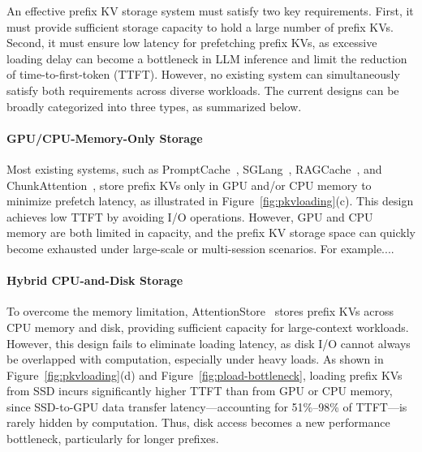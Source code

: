 

An effective prefix KV storage system must satisfy two key requirements. First, it must provide sufficient storage capacity to hold a large number of prefix KVs. Second, it must ensure low latency for prefetching prefix KVs, as excessive loading delay can become a bottleneck in LLM inference and limit the reduction of time-to-first-token (TTFT). However, no existing system can simultaneously satisfy both requirements across diverse workloads. The current designs can be broadly categorized into three types, as summarized below.

\paragraph{GPU/CPU-Memory-Only Storage}  
Most existing systems, such as PromptCache~\cite{promptcache-mlsys24}, SGLang~\cite{sglang-arxiv23}, RAGCache~\cite{ragcache-arxiv24}, and ChunkAttention~\cite{chunkattention-arxiv24}, store prefix KVs only in GPU and/or CPU memory to minimize prefetch latency, as illustrated in Figure~\ref{fig:pkvloading}(c). This design achieves low TTFT by avoiding I/O operations. However, GPU and CPU memory are both limited in capacity, and the prefix KV storage space can quickly become exhausted under large-scale or multi-session scenarios.
For example....


\paragraph{Hybrid CPU-and-Disk Storage}  
To overcome the memory limitation, AttentionStore~\cite{attentionstore-atc24} stores prefix KVs across CPU memory and disk, providing sufficient capacity for large-context workloads. However, this design fails to eliminate loading latency, as disk I/O cannot always be overlapped with computation, especially under heavy loads. As shown in Figure~\ref{fig:pkvloading}(d) and Figure~\ref{fig:pload-bottleneck}, loading prefix KVs from SSD incurs significantly higher TTFT than from GPU or CPU memory, since SSD-to-GPU data transfer latency—accounting for  51\%–98\%  of TTFT—is rarely hidden by computation. Thus, disk access becomes a new performance bottleneck, particularly for longer prefixes.




